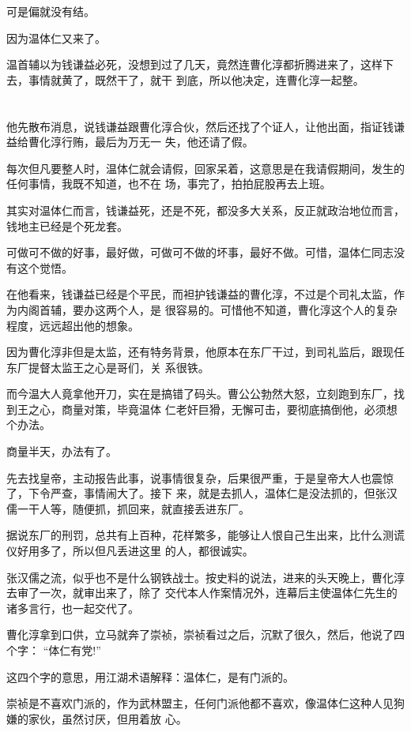 \documentclass[11pt,a4paper,onecolumn]{article}
\begin{document}
可是偏就没有结。

因为温体仁又来了。

温首辅以为钱谦益必死，没想到过了几天，竟然连曹化淳都折腾进来了，这样下去，事情就黄了，既然干了，就干
到底，所以他决定，连曹化淳一起整。

\section[\thesection]{}

他先散布消息，说钱谦益跟曹化淳合伙，然后还找了个证人，让他出面，指证钱谦益给曹化淳行贿，最后为万无一
失，他还请了假。

每次但凡要整人时，温体仁就会请假，回家呆着，这意思是在我请假期间，发生的任何事情，我既不知道，也不在
场，事完了，拍拍屁股再去上班。

其实对温体仁而言，钱谦益死，还是不死，都没多大关系，反正就政治地位而言，钱地主已经是个死龙套。

可做可不做的好事，最好做，可做可不做的坏事，最好不做。可惜，温体仁同志没有这个觉悟。

在他看来，钱谦益已经是个平民，而袒护钱谦益的曹化淳，不过是个司礼太监，作为内阁首辅，要办这两个人，是
很容易的。可惜他不知道，曹化淳这个人的复杂程度，远远超出他的想象。

因为曹化淳非但是太监，还有特务背景，他原本在东厂干过，到司礼监后，跟现任东厂提督太监王之心是哥们，关
系很铁。

而今温大人竟拿他开刀，实在是搞错了码头。曹公公勃然大怒，立刻跑到东厂，找到王之心，商量对策，毕竟温体
仁老奸巨猾，无懈可击，要彻底搞倒他，必须想个办法。

商量半天，办法有了。

先去找皇帝，主动报告此事，说事情很复杂，后果很严重，于是皇帝大人也震惊了，下令严查，事情闹大了。接下
来，就是去抓人，温体仁是没法抓的，但张汉儒一干人等，随便抓，抓回来，就直接丢进东厂。

据说东厂的刑罚，总共有上百种，花样繁多，能够让人恨自己生出来，比什么测谎仪好用多了，所以但凡丢进这里
的人，都很诚实。

张汉儒之流，似乎也不是什么钢铁战士。按史料的说法，进来的头天晚上，曹化淳去审了一次，就审出来了，除了
交代本人作案情况外，连幕后主使温体仁先生的诸多言行，也一起交代了。

曹化淳拿到口供，立马就奔了崇祯，崇祯看过之后，沉默了很久，然后，他说了四个字： ``体仁有党!''

这四个字的意思，用江湖术语解释：温体仁，是有门派的。

崇祯是不喜欢门派的，作为武林盟主，任何门派他都不喜欢，像温体仁这种人见狗嫌的家伙，虽然讨厌，但用着放
心。
\end{document}
